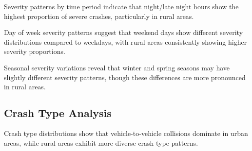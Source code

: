 \documentclass[12pt,a4paper]{article}
\begin{document}
Severity patterns by time period indicate that night/late night hours show the highest proportion of severe crashes, particularly in rural areas. %


Day of week severity patterns suggest that weekend days show different severity distributions compared to weekdays, with rural areas consistently showing higher severity proportions. %


Seasonal severity variations reveal that winter and spring seasons may have slightly different severity patterns, though these differences are more pronounced in rural areas. %


\subsection{Crash Type Analysis}

Crash type distributions show that vehicle-to-vehicle collisions dominate in urban areas, while rural areas exhibit more diverse crash type patterns. %

\end{document}
